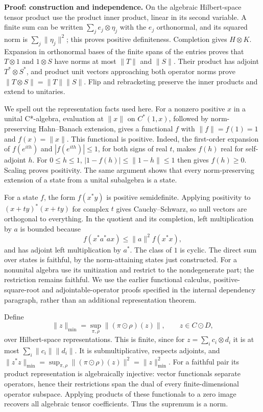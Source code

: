 \documentclass[
  11pt,
]{article}
\begin{document}
\textbf{Proof: construction and independence.} On the algebraic
Hilbert-space tensor product use the product inner product, linear in
its second variable. A finite sum can be written
\(\sum_j e_j\otimes\eta_j\) with the \(e_j\) orthonormal, and its
squared norm is \(\sum_j\|\eta_j\|^2\); this proves positive
definiteness. Completion gives \(H\otimes K\). Expansion in orthonormal
bases of the finite spans of the entries proves that \(T\otimes1\) and
\(1\otimes S\) have norms at most \(\|T\|\) and \(\|S\|\). Their product
has adjoint \(T^*\otimes S^*\), and product unit vectors approaching
both operator norms prove \(\|T\otimes S\|=\|T\|\|S\|\). Flip and
rebracketing preserve the inner products and extend to unitaries.

We spell out the representation facts used here. For a nonzero positive
\(x\) in a unital C*-algebra, evaluation at \(\|x\|\) on \(C^*(1,x)\),
followed by norm-preserving Hahn--Banach extension, gives a functional
\(f\) with \(\|f\|=f(1)=1\) and \(f(x)=\|x\|\). This functional is
positive. Indeed, the first-order expansion of \(f(e^{ith})\) and
\(|f(e^{ith})|\leq1\), for both signs of real \(t\), makes \(f(h)\) real
for self-adjoint \(h\). For \(0\leq h\leq1\),
\(|1-f(h)|\leq\|1-h\|\leq1\) then gives \(f(h)\geq0\). Scaling proves
positivity. The same argument shows that every norm-preserving extension
of a state from a unital subalgebra is a state.

For a state \(f\), the form \(f(x^*y)\) is positive semidefinite.
Applying positivity to \((x+ty)^*(x+ty)\) for complex \(t\) gives
Cauchy--Schwarz, so null vectors are orthogonal to everything. In the
quotient and its completion, left multiplication by \(a\) is bounded
because \[
f(x^*a^*ax)\leq\|a\|^2 f(x^*x),
\] and has adjoint left multiplication by \(a^*\). The class of \(1\) is
cyclic. The direct sum over states is faithful, by the norm-attaining
states just constructed. For a nonunital algebra use its unitization and
restrict to the nondegenerate part; the restriction remains faithful. We
use the earlier functional calculus, positive-square-root and
adjointable-operator proofs specified in the internal dependency
paragraph, rather than an additional representation theorem.

Define \[
\|z\|_{\min}=\sup_{\pi,\rho}\|(\pi\odot\rho)(z)\|,
\qquad z\in C\odot D,
\] over Hilbert-space representations. This is finite, since for
\(z=\sum_i c_i\otimes d_i\) it is at most \(\sum_i\|c_i\|\|d_i\|\). It
is submultiplicative, respects adjoints, and
\(\|z^*z\|_{\min}=\sup_{\pi,\rho}\|(\pi\odot\rho)(z)\|^2=\|z\|_{\min}^2\).
For a faithful pair its product representation is algebraically
injective: vector functionals separate operators, hence their
restrictions span the dual of every finite-dimensional operator
subspace. Applying products of these functionals to a zero image
recovers all algebraic tensor coefficients. Thus the supremum is a norm.
\end{document}
